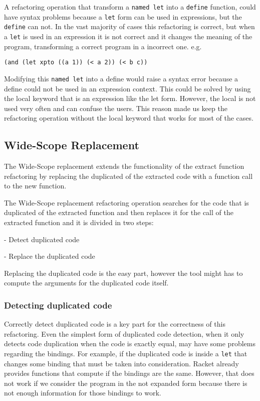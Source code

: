 A refactoring operation that transform a {\tt named let} into a {\tt define} function,
 could have syntax problems because a {\tt let} form can be used in expressions, but the {\tt define} can not.
In the vast majority of cases this refactoring is correct, but when a {\tt let} is used in an expression
it is not correct and it changes the meaning of the program, transforming a correct
program in a incorrect one.
e.g.
\begin{lstlisting}[basicstyle=\ttfamily, caption="Let in an expression"]
(and (let xpto ((a 1)) (< a 2)) (< b c))
\end{lstlisting}
Modifying this {\tt named let} into a define would raise a syntax error because a
define could not be used in an expression context.
This could be solved by using the local keyword that is an expression like
the let form.
However, the local is not used very often and can confuse the users.
This reason made us keep the refactoring operation without the local keyword that works for
most of the cases.


\subsection{Wide-Scope Replacement} %
The Wide-Scope replacement extends the functionality of the extract function refactoring
by replacing the duplicated of the extracted code with a function call to the new function.


The Wide-Scope replacement refactoring operation searches for the code that is duplicated of the extracted
function and then replaces it for the call of the
extracted function and it is divided in two steps: %

- Detect duplicated code

- Replace the duplicated code

Replacing the duplicated code is the easy part, however the tool might has to compute %
the arguments for the duplicated code itself.

\subsubsection{Detecting duplicated code}
Correctly detect duplicated code is a key part for the correctness of this refactoring.
Even the simplest form of duplicated code detection, when it only detects code duplication
when the code is exactly equal, may have some problems regarding the bindings.
For example, if the duplicated code is inside a {\tt let} that changes some binding that must
be taken into consideration.
Racket already provides functions that compute if the bindings are the same.
However, that does not work if we consider the program in the not expanded
form because there is not enough information for those bindings to work. %

